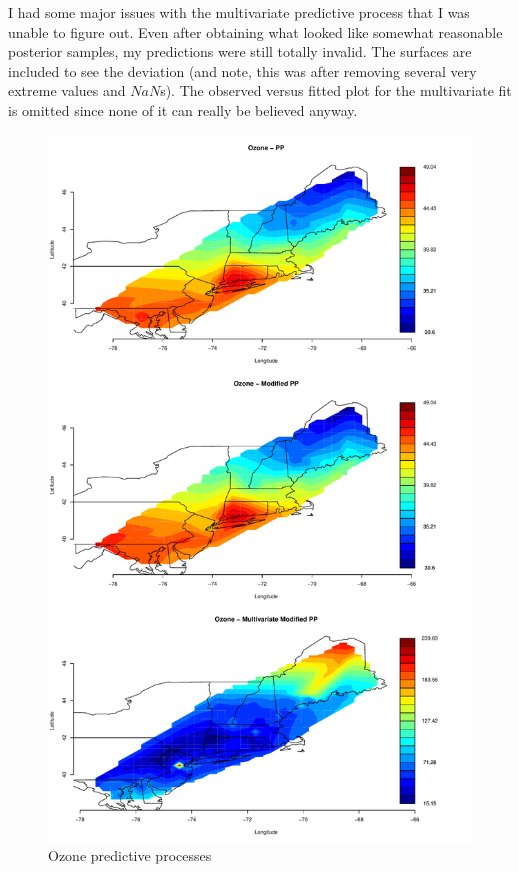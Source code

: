 \documentclass[12pt]{article}
\begin{document}
I had some major issues with the multivariate predictive process that I was unable to figure out. Even after obtaining what looked like somewhat reasonable posterior samples, my predictions were still totally invalid. The surfaces are included to see the deviation (and note, this was after removing several very extreme values and $NaN$s). The observed versus fitted plot for the multivariate fit is omitted since none of it can really be believed anyway.


\begin{figure}[ht]
\begin{center}
\includegraphics[scale=0.5]{figs/ozone_pp.pdf}
\end{center}
\caption{Ozone predictive processes}
\end{figure}
\end{document}
